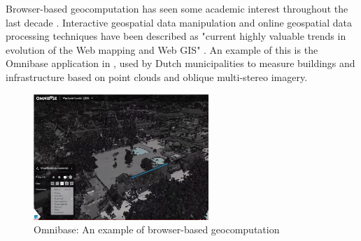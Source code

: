 
Browser-based geocomputation has seen some academic interest throughout the last decade \cite{hamilton_client-side_2014, panidi_hybrid_2015, kulawiak_analysis_2019}.
Interactive geospatial data manipulation and online geospatial data processing techniques have been described as "current highly valuable trends in evolution of the Web mapping and Web GIS" \cite{panidi_hybrid_2015}. 
An example of this is the Omnibase application \citep{geodelta_omnibase_2022} in , used by Dutch municipalities to measure buildings and infrastructure based on point clouds and oblique multi-stereo imagery.

\begin{figure}
  \centering
  \graphicspath{ {../../assets/images/background/geo-web/} }
  \includegraphics[width=250px]{omnibase.png}
  \caption{Omnibase: An example of browser-based geocomputation \citep{geodelta_omnibase_2022}}
  \label{fig:1:omnibase}
\end{figure}

